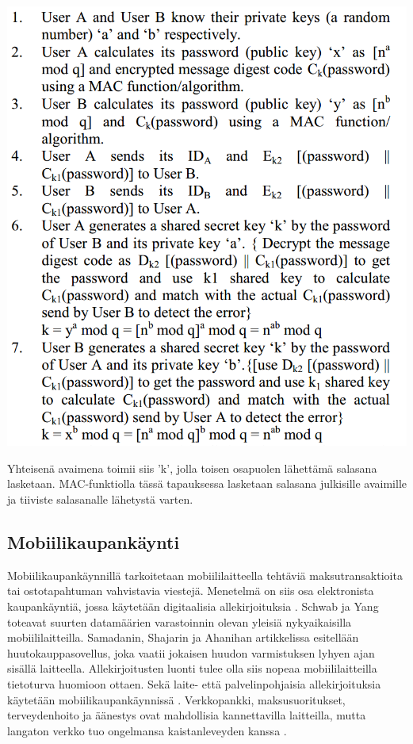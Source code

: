 \documentclass[finnish]{tktltiki2}
\theoremstyle{definition}
\theoremstyle{remark}
\begin{document}
\includegraphics[scale=0.5]{MAC-salasana}

Yhteisenä avaimena toimii siis 'k', jolla toisen osapuolen lähettämä salasana lasketaan. MAC-funktiolla tässä tapauksessa lasketaan salasana julkisille avaimille ja tiiviste salasanalle lähetystä varten.




\subsection{Mobiilikaupankäynti}

Mobiilikaupankäynnillä tarkoitetaan mobiililaitteella tehtäviä maksutransaktioita tai ostotapahtuman vahvistavia viestejä. Menetelmä on siis osa elektronista kaupankäyntiä, jossa käytetään digitaalisia allekirjoituksia \cite{e-c}. Schwab ja Yang toteavat  \cite{enti} suurten datamäärien varastoinnin olevan yleisiä nykyaikaisilla mobiililaitteilla. Samadanin, Shajarin ja Ahanihan artikkelissa \cite{proxy} esitellään huutokauppasovellus, joka vaatii jokaisen huudon varmistuksen lyhyen ajan sisällä laitteella. Allekirjoitusten luonti tulee olla siis nopeaa mobiililaitteilla tietoturva huomioon ottaen. Sekä laite- että palvelinpohjaisia allekirjoituksia käytetään mobiilikaupankäynnissä \cite{proxy}. Verkkopankki, maksusuoritukset, terveydenhoito ja äänestys ovat mahdollisia kannettavilla laitteilla, mutta langaton verkko tuo ongelmansa kaistanleveyden kanssa \cite{ECC}. 
\end{document}

